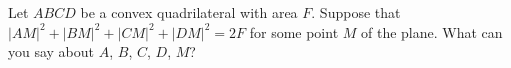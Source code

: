 Let $ABCD$ be a convex quadrilateral with area $F$. Suppose that $|AM|^2 + |BM|^2 + |CM|^2 + |DM|^2 = 2F$ for some point $M$ of the plane. What can you say about $A$, $B$, $C$, $D$, $M$?
